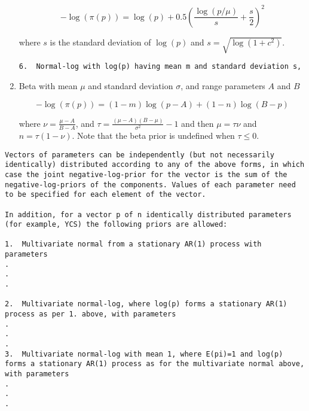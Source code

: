 \begin{enumerate}
\begin{equation}
 - \log \left(\pi \left(p \right) \right) = \log \left( p \right) + 0.5 \left( \frac{\log \left( p / \mu \right)}{s} + \frac{s}{2} \right)^2
\end{equation}

where $s$ is the standard deviation of $\log(p)$ and $s= \sqrt{\log \left(1+c^2 \right)}$.

\CA
\begin{lstlisting}
6.	Normal-log with log(p) having mean m and standard deviation s, 
\end{lstlisting}

\item{Beta with mean $\mu$ and standard deviation $\sigma$, and range parameters $A$ and $B$}

\begin{equation}
 - \log \left(\pi \left( p \right) \right) = \left( 1 - m \right) \log \left( p - A \right) + \left( 1 - n \right)\log \left( B - p \right)
\end{equation}

where $\nu  = \frac{\mu  - A}{B - A}$, and $\tau = \frac{\left(\mu -A \right)\left(B - \mu \right)}{\sigma ^2} - 1$ and then $\mu=\tau \nu$ and $n=\tau(1-\nu)$. Note that the beta prior is undefined when $\tau \leq 0$.

\end{enumerate}

\CA
\begin{lstlisting}
Vectors of parameters can be independently (but not necessarily identically) distributed according to any of the above forms, in which case the joint negative-log-prior for the vector is the sum of the negative-log-priors of the components. Values of each parameter need to be specified for each element of the vector. 

In addition, for a vector p of n identically distributed parameters (for example, YCS) the following priors are allowed: 

1.	Multivariate normal from a stationary AR(1) process with parameters 
.
.
.

2.	Multivariate normal-log, where log(p) forms a stationary AR(1) process as per 1. above, with parameters
.
.
.
3.	Multivariate normal-log with mean 1, where E(pi)=1 and log(p) forms a stationary AR(1) process as for the multivariate normal above, with parameters 
.
.
.
\end{lstlisting}





